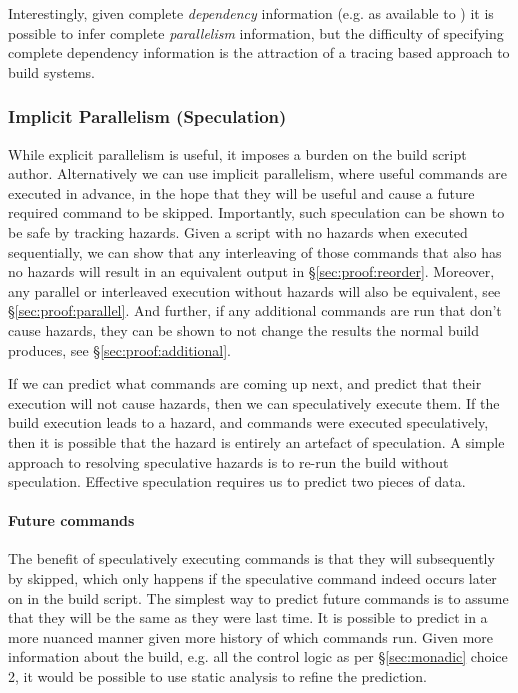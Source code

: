 Interestingly, given complete \emph{dependency} information (e.g. as available to \Make) it is possible to infer complete \emph{parallelism} information, but the difficulty of specifying complete dependency information is the attraction of a tracing based approach to build systems.

\subsubsection{Implicit Parallelism (Speculation)}
\label{sec:speculation}

While explicit parallelism is useful, it imposes a burden on the build script author. Alternatively we can use implicit parallelism, where useful commands are executed in advance, in the hope that they will be useful and cause a future required command to be skipped. Importantly, such speculation can be shown to be safe by tracking hazards. Given a script with no hazards when executed sequentially, we can show that any interleaving of those commands that also has no hazards will result in an equivalent output in \S\ref{sec:proof:reorder}. Moreover, any parallel or interleaved execution without hazards will also be equivalent, see \S\ref{sec:proof:parallel}. And further, if any additional commands are run that don't cause hazards, they can be shown to not change the results the normal build produces, see \S\ref{sec:proof:additional}.

If we can predict what commands are coming up next, and predict that their execution will not cause hazards, then we can speculatively execute them. If the build execution leads to a hazard, and commands were executed speculatively, then it is possible that the hazard is entirely an artefact of speculation. A simple approach to resolving speculative hazards is to re-run the build without speculation. Effective speculation requires us to predict two pieces of data.

\paragraph{Future commands} The benefit of speculatively executing commands is that they will subsequently by skipped, which only happens if the speculative command indeed occurs later on in the build script. The simplest way to predict future commands is to assume that they will be the same as they were last time. It is possible to predict in a more nuanced manner given more history of which commands run. Given more information about the build, e.g. all the control logic as per \S\ref{sec:monadic} choice 2, it would be possible to use static analysis to refine the prediction.

